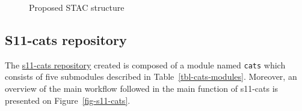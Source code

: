 \documentclass[
  oneside,
  open=any]{scrbook}
\begin{document}
\begin{figure}[H]


\caption{\label{fig-stac-str}Proposed STAC structure}

\end{figure}%

\subsection{S11-cats repository}\label{s11-cats-repository}

The \href{https://gitlab.com/satelligence/s11-cats}{s11-cats repository}
created is composed of a module named \texttt{cats} which consists of
five submodules described in Table~\ref{tbl-cats-modules}. Moreover, an
overview of the main workflow followed in the main function of s11-cats
is presented on Figure~\ref{fig-s11-cats}.
\end{document}
